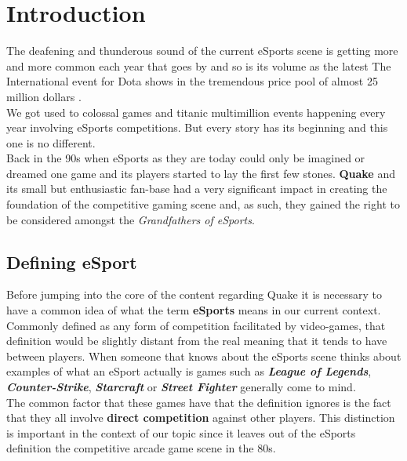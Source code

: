 \section{Introduction}
\label{sec::introduction}

The deafening and thunderous sound of the current eSports scene is getting more and more common each year that goes by and so is its volume as the latest The International event for Dota shows in the tremendous price pool of almost 25 million dollars \citep{esportsEarnings}.\\

We got used to colossal games and titanic multimillion events happening every year involving eSports competitions. But every story has its beginning and this one is no different.\\

Back in the 90s when eSports as they are today could only be imagined or dreamed one game and its players started to lay the first few stones. \textbf{Quake} and its small but enthusiastic fan-base had a very significant impact in creating the foundation of the competitive gaming scene and, as such, they gained the right to be considered amongst the \textit{Grandfathers of eSports}.\\

\subsection{Defining eSport}

Before jumping into the core of the content regarding Quake it is necessary to have a common idea of what the term \textbf{eSports} means in our current context. Commonly defined as any form of competition facilitated by video-games, that definition would be slightly distant from the real meaning that it tends to have between players. When someone that knows about the eSports scene thinks about examples of what an eSport actually is games such as \textbf{\textit{League of Legends}}, \textit{\textbf{Counter-Strike}}, \textbf{\textit{Starcraft}} or \textit{\textbf{Street Fighter}} generally come to mind.\\

The common factor that these games have that the definition ignores is the fact that they all involve \textbf{direct competition} against other players. This distinction is important in the context of our topic since it leaves out of the eSports definition the competitive arcade game scene in the 80s.\\

